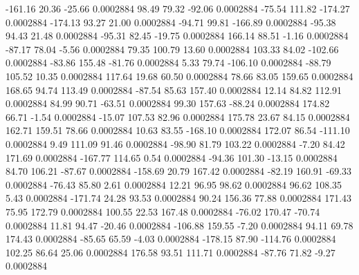      -161.16       20.36      -25.66     0.0002884
       98.49       79.32      -92.06     0.0002884
      -75.54      111.82     -174.27     0.0002884
     -174.13       93.27       21.00     0.0002884
      -94.71       99.81     -166.89     0.0002884
      -95.38       94.43       21.48     0.0002884
      -95.31       82.45      -19.75     0.0002884
      166.14       88.51       -1.16     0.0002884
      -87.17       78.04       -5.56     0.0002884
       79.35      100.79       13.60     0.0002884
      103.33       84.02     -102.66     0.0002884
      -83.86      155.48      -81.76     0.0002884
        5.33       79.74     -106.10     0.0002884
      -88.79      105.52       10.35     0.0002884
      117.64       19.68       60.50     0.0002884
       78.66       83.05      159.65     0.0002884
      168.65       94.74      113.49     0.0002884
      -87.54       85.63      157.40     0.0002884
       12.14       84.82      112.91     0.0002884
       84.99       90.71      -63.51     0.0002884
       99.30      157.63      -88.24     0.0002884
      174.82       66.71       -1.54     0.0002884
      -15.07      107.53       82.96     0.0002884
      175.78       23.67       84.15     0.0002884
      162.71      159.51       78.66     0.0002884
       10.63       83.55     -168.10     0.0002884
      172.07       86.54     -111.10     0.0002884
        9.49      111.09       91.46     0.0002884
      -98.90       81.79      103.22     0.0002884
       -7.20       84.42      171.69     0.0002884
     -167.77      114.65        0.54     0.0002884
      -94.36      101.30      -13.15     0.0002884
       84.70      106.21      -87.67     0.0002884
     -158.69       20.79      167.42     0.0002884
      -82.19      160.91      -69.33     0.0002884
      -76.43       85.80        2.61     0.0002884
       12.21       96.95       98.62     0.0002884
       96.62      108.35        5.43     0.0002884
     -171.74       24.28       93.53     0.0002884
       90.24      156.36       77.88     0.0002884
      171.43       75.95      172.79     0.0002884
      100.55       22.53      167.48     0.0002884
      -76.02      170.47      -70.74     0.0002884
       11.81       94.47      -20.46     0.0002884
     -106.88      159.55       -7.20     0.0002884
       94.11       69.78      174.43     0.0002884
      -85.65       65.59       -4.03     0.0002884
     -178.15       87.90     -114.76     0.0002884
      102.25       86.64       25.06     0.0002884
      176.58       93.51      111.71     0.0002884
      -87.76       71.82       -9.27     0.0002884
